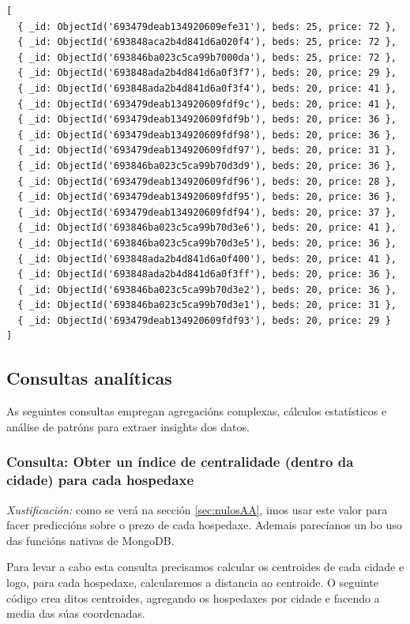 \documentclass[12pt,a4paper]{article}
\begin{document}
\begin{lstlisting}[style=terminal]
[
  { _id: ObjectId('693479deab134920609efe31'), beds: 25, price: 72 },
  { _id: ObjectId('693848aca2b4d841d6a020f4'), beds: 25, price: 72 },
  { _id: ObjectId('693846ba023c5ca99b7000da'), beds: 25, price: 72 },
  { _id: ObjectId('693848ada2b4d841d6a0f3f7'), beds: 20, price: 29 },
  { _id: ObjectId('693848ada2b4d841d6a0f3f4'), beds: 20, price: 41 },
  { _id: ObjectId('693479deab134920609fdf9c'), beds: 20, price: 41 },
  { _id: ObjectId('693479deab134920609fdf9b'), beds: 20, price: 36 },
  { _id: ObjectId('693479deab134920609fdf98'), beds: 20, price: 36 },
  { _id: ObjectId('693479deab134920609fdf97'), beds: 20, price: 31 },
  { _id: ObjectId('693846ba023c5ca99b70d3d9'), beds: 20, price: 36 },
  { _id: ObjectId('693479deab134920609fdf96'), beds: 20, price: 28 },
  { _id: ObjectId('693479deab134920609fdf95'), beds: 20, price: 36 },
  { _id: ObjectId('693479deab134920609fdf94'), beds: 20, price: 37 },
  { _id: ObjectId('693846ba023c5ca99b70d3e6'), beds: 20, price: 41 },
  { _id: ObjectId('693846ba023c5ca99b70d3e5'), beds: 20, price: 36 },
  { _id: ObjectId('693848ada2b4d841d6a0f400'), beds: 20, price: 41 },
  { _id: ObjectId('693848ada2b4d841d6a0f3ff'), beds: 20, price: 36 },
  { _id: ObjectId('693846ba023c5ca99b70d3e2'), beds: 20, price: 36 },
  { _id: ObjectId('693846ba023c5ca99b70d3e1'), beds: 20, price: 31 },
  { _id: ObjectId('693479deab134920609fdf93'), beds: 20, price: 29 }
]
\end{lstlisting}

\subsection{Consultas analíticas}

As seguintes consultas empregan agregacións complexas, cálculos estatísticos e análise de patróns para extraer insights dos datos.

\subsubsection{Consulta: Obter un índice de centralidade (dentro da cidade) para cada hospedaxe} 
\label{consulta1}

\emph{Xustificación:} como se verá na sección \ref{sec:nulosAA}, imos usar este valor para facer prediccións sobre o prezo de cada hospedaxe. Ademais parecíanos un bo uso das funcións nativas de MongoDB.

Para levar a cabo esta consulta precisamos calcular os centroides de cada cidade e logo, para cada hospedaxe, calcularemos a distancia ao centroide. O seguinte código crea ditos centroides, agregando os hospedaxes por cidade e facendo a media das súas coordenadas.
\end{document}
